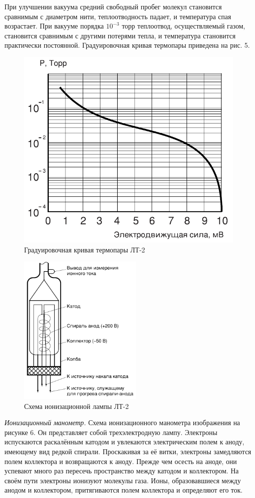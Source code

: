 \documentclass[12pt,a4paper]{article}
\begin{document}
При улучшении вакуума средний свободный пробег молекул становится сравнимым с диаметром нити, \linebreak теплоотводность падает, и температура спая возрастает. При вакууме порядка $10^{-3}$ торр теплоотвод, осуществляемый газом, становится сравнимым с другими потерями тепла, и температура становится практически постоянной. Градуировочная кривая термопары приведена на рис. 5. \\
\begin{figure}[!h]
    \centering
    \includegraphics[width=0.3\linewidth]{"picks/градуировочная кривая"}
    \caption[]{Градуировочная кривая термопары ЛТ-2}
    \label{fig:Градуировочная кривая}
\end{figure}
\newpage
\begin{figure} %
    \begin{center}
        \includegraphics[width=60mm]{"picks/лампа"}
        \caption{Схема ионизационной лампы ЛТ-2}
        \label{fig:лампа}
    \end{center}
\end{figure}
\textit{Ионизационный манометр.} Схема ионизационного манометра изображения на рисунке 6. Он представляет собой трехэлектродную лампу. Электроны испускаются раскалённым катодом и увлекаются электрическим полем к аноду, имеющему вид редкой спирали. Проскакивая за её витки, электроны замедляются полем коллектора и возвращаются к аноду. Прежде чем осесть на аноде, они успевают много раз пересечь пространство между катодом и коллектором. На своём пути электроны ионизуют молекулы газа. Ионы, образовавшиеся между анодом и коллектором, притягиваются полем коллектора и определяют его ток. \\
\end{document}
